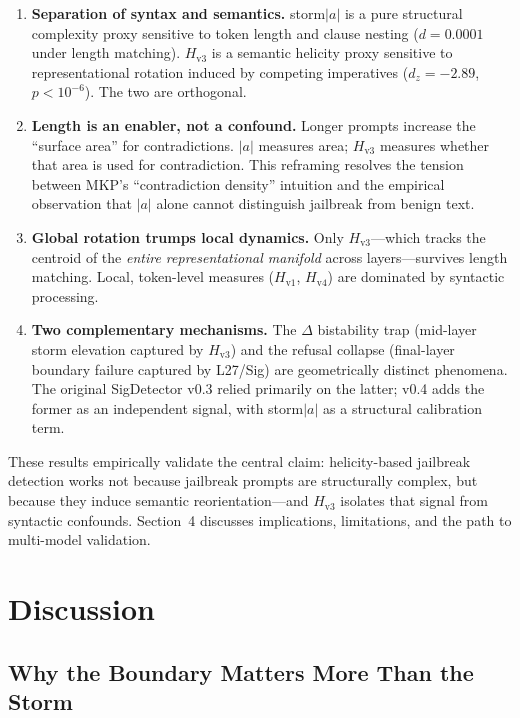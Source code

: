 \documentclass[12pt,a4paper]{article}
\begin{document}
\begin{enumerate}[leftmargin=*]
    \item \textbf{Separation of syntax and semantics.} storm$|a|$ is a pure structural complexity proxy sensitive to token length and clause nesting ($d = 0.0001$ under length matching). $H_{\text{v3}}$ is a semantic helicity proxy sensitive to representational rotation induced by competing imperatives ($d_z = -2.89$, $p < 10^{-6}$). The two are orthogonal.
    \item \textbf{Length is an enabler, not a confound.} Longer prompts increase the ``surface area'' for contradictions. $|a|$ measures area; $H_{\text{v3}}$ measures whether that area is used for contradiction. This reframing resolves the tension between MKP's ``contradiction density'' intuition and the empirical observation that $|a|$ alone cannot distinguish jailbreak from benign text.
    \item \textbf{Global rotation trumps local dynamics.} Only $H_{\text{v3}}$---which tracks the centroid of the \textit{entire representational manifold} across layers---survives length matching. Local, token-level measures ($H_{\text{v1}}$, $H_{\text{v4}}$) are dominated by syntactic processing.
    \item \textbf{Two complementary mechanisms.} The $\Delta$ bistability trap (mid-layer storm elevation captured by $H_{\text{v3}}$) and the refusal collapse (final-layer boundary failure captured by L27/Sig) are geometrically distinct phenomena. The original SigDetector v0.3 relied primarily on the latter; v0.4 adds the former as an independent signal, with storm$|a|$ as a structural calibration term.
\end{enumerate}

These results empirically validate the central claim: helicity-based jailbreak detection works not because jailbreak prompts are structurally complex, but because they induce semantic reorientation---and $H_{\text{v3}}$ isolates that signal from syntactic confounds. Section~4 discusses implications, limitations, and the path to multi-model validation.

\section{Discussion}

\subsection{Why the Boundary Matters More Than the Storm}
\end{document}

